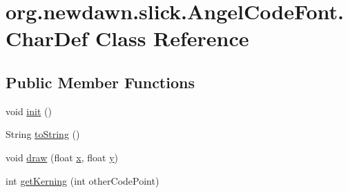 \hypertarget{classorg_1_1newdawn_1_1slick_1_1_angel_code_font_1_1_char_def}{}\section{org.\+newdawn.\+slick.\+Angel\+Code\+Font.\+Char\+Def Class Reference}
\label{classorg_1_1newdawn_1_1slick_1_1_angel_code_font_1_1_char_def}
\subsection*{Public Member Functions}
\begin{DoxyCompactItemize}
\item 
void \mbox{\hyperlink{classorg_1_1newdawn_1_1slick_1_1_angel_code_font_1_1_char_def_a3ea6d6d64220a293e70a14d90151f359}{init}} ()
\item 
String \mbox{\hyperlink{classorg_1_1newdawn_1_1slick_1_1_angel_code_font_1_1_char_def_a45a232a9574e081d09124fce30b8989f}{to\+String}} ()
\item 
void \mbox{\hyperlink{classorg_1_1newdawn_1_1slick_1_1_angel_code_font_1_1_char_def_a059a3e0c81e8612caea0697be5a14b75}{draw}} (float \mbox{\hyperlink{classorg_1_1newdawn_1_1slick_1_1_angel_code_font_1_1_char_def_a528f233655a70cbf7dcbae24d6bb3ae4}{x}}, float \mbox{\hyperlink{classorg_1_1newdawn_1_1slick_1_1_angel_code_font_1_1_char_def_a00004936be32e58efcc3b1da7d97108b}{y}})
\item 
int \mbox{\hyperlink{classorg_1_1newdawn_1_1slick_1_1_angel_code_font_1_1_char_def_a3b153d43da2f6f3b07e49804b762470d}{get\+Kerning}} (int other\+Code\+Point)
\end{DoxyCompactItemize}
